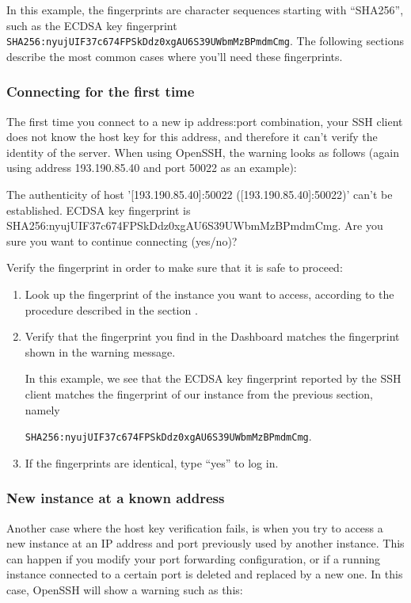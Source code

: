 In this example, the fingerprints are character sequences starting
with ``SHA256'', such as the ECDSA key fingerprint
\lstinline{SHA256:nyujUIF37c674FPSkDdz0xgAU6S39UWbmMzBPmdmCmg}.  The
following sections describe the most common cases where you'll need
these fingerprints.

\subsubsection*{Connecting for the first time}\label{sec:conn-first-time}
The first time you connect to a new ip address:port combination, your SSH client does not know the host key for this address, and therefore it can't verify the identity of the server.  When using OpenSSH, the warning looks as follows (again using address 193.190.85.40 and port 50022 as an example):

\begin{prompt}
The authenticity of host '[193.190.85.40]:50022 ([193.190.85.40]:50022)'
can't be established.
ECDSA key fingerprint is SHA256:nyujUIF37c674FPSkDdz0xgAU6S39UWbmMzBPmdmCmg.
Are you sure you want to continue connecting (yes/no)?
\end{prompt}

Verify the fingerprint in order to make sure that it is safe to
proceed:

\begin{enumerate}
\item Look up the fingerprint of the instance you want to access,
  according to the procedure described in the section
  .
\item Verify that the fingerprint you find in the Dashboard matches
  the fingerprint shown in the warning message.

  In this example, we see that the ECDSA key fingerprint reported by
  the SSH client matches the fingerprint of our instance from the
  previous section, namely

  \lstinline{SHA256:nyujUIF37c674FPSkDdz0xgAU6S39UWbmMzBPmdmCmg}.

\item If the fingerprints are identical, type ``yes'' to log in.
\end{enumerate}

\subsubsection{New instance at a known address}
Another case where the host key verification fails, is when you try to access a new instance at an IP address and port previously used by another instance.  This can happen if you modify your port forwarding configuration, or if a running instance connected to a certain port is deleted and replaced by a new one.  In this case, OpenSSH will show a warning such as this:

